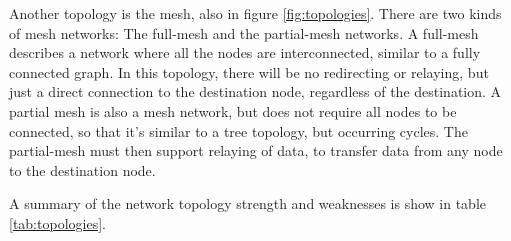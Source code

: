 Another topology is the mesh, also in figure \ref{fig:topologies}. There are two kinds of mesh networks: The full-mesh and the partial-mesh networks. A full-mesh describes a network where all the nodes are interconnected, similar to a fully connected graph. In this topology, there will be no redirecting or relaying, but just a direct connection to the destination node, regardless of the destination. A partial mesh is also a mesh network, but does not require all nodes to be connected, so that it's similar to a tree topology, but occurring cycles. The partial-mesh must then support relaying of data, to transfer data from any node to the destination node.

A summary of the network topology strength and weaknesses is show in table \ref{tab:topologies}.
\begin{figure}
\end{figure}
